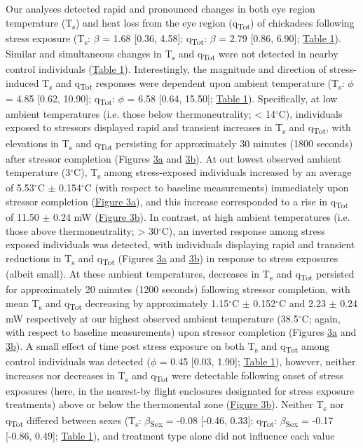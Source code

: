 \documentclass[12pt]{article}
\begin{document}
\noindent Our analyses detected rapid and pronounced changes in both eye region temperature (T\textsubscript{s}) and heat loss from the eye region (q\textsubscript{Tot}) of chickadees following stress exposure (T\textsubscript{s}: $\beta$ = 1.68 [0.36, 4.58]; q\textsubscript{Tot}: $\beta$ = 2.79 [0.86, 6.90]; \hyperref[Tab4.1]{Table 1}). Similar and simultaneous changes in T\textsubscript{s} and q\textsubscript{Tot} were not detected in nearby control individuals (\hyperref[Tab4.1]{Table 1}). Interestingly, the magnitude and direction of stress-induced T\textsubscript{s} and q\textsubscript{Tot} responses were dependent upon ambient temperature (T\textsubscript{s}: $\phi$ = 4.85 [0.62, 10.90]; q\textsubscript{Tot}: $\phi$ = 6.58 [0.64, 15.50]; \hyperref[Tab4.1]{Table 1}). Specifically, at low ambient temperatures (i.e. those below thermoneutrality; < 14$^{\circ}$C), individuals exposed to stressors displayed rapid and transient increases in T\textsubscript{s} and q\textsubscript{Tot}, with elevations in T\textsubscript{s} and q\textsubscript{Tot} persisting for approximately 30 minutes (1800 seconds) after stressor completion (Figures \hyperref[Fig4.3]{3a} and \hyperref[Fig4.3]{3b}). At out lowest observed ambient temperature (3$^{\circ}$C), T\textsubscript{s} among stress-exposed individuals increased by an average of 5.53$^{\circ}$C $\pm$ 0.154$^{\circ}$C (with respect to baseline measurements) immediately upon stressor completion (\hyperref[Fig4.3]{Figure 3a}), and this increase corresponded to a rise in q\textsubscript{Tot} of 11.50 $\pm$ 0.24 mW (\hyperref[Fig4.3]{Figure 3b}). In contrast, at high ambient temperatures (i.e. those above thermoneutrality; > 30$^{\circ}$C), an inverted response among stress exposed individuals was detected, with individuals displaying rapid and transient reductions in T\textsubscript{s} and q\textsubscript{Tot} (Figures \hyperref[Fig4.3]{3a} and \hyperref[Fig4.3]{3b}) in response to stress exposures (albeit small). At these ambient temperatures, decreases in T\textsubscript{s} and q\textsubscript{Tot} persisted for approximately 20 minutes (1200 seconds) following stressor completion, with mean T\textsubscript{s} and q\textsubscript{Tot} decreasing by approximately 1.15$^{\circ}$C $\pm$ 0.152$^{\circ}$C and 2.23 $\pm$ 0.24 mW respectively at our highest observed ambient temperature (38.5$^{\circ}$C; again, with respect to baseline measurements) upon stressor completion (Figures \hyperref[Fig4.3]{3a} and \hyperref[Fig4.3]{3b}). A small effect of time post stress exposure on both T\textsubscript{s} and q\textsubscript{Tot} among control individuals was detected ($\phi$ = 0.45 [0.03, 1.90]; \hyperref[Tab4.1]{Table 1}), however, neither increases nor decreases in T\textsubscript{s} and q\textsubscript{Tot} were detectable following onset of stress exposures (here, in the nearest-by flight enclosures designated for stress exposure treatments) above or below the thermoneutal zone (\hyperref[Fig4.3]{Figure 3b}). Neither T\textsubscript{s} nor q\textsubscript{Tot} differed between sexes (T\textsubscript{s}: $\beta$\textsubscript{Sex} = -0.08 [-0.46, 0.33]; q\textsubscript{Tot}: $\beta$\textsubscript{Sex} = -0.17 [-0.86, 0.49]; \hyperref[Tab4.1]{Table 1}), and treatment type alone did not influence each value 
\end{document}
